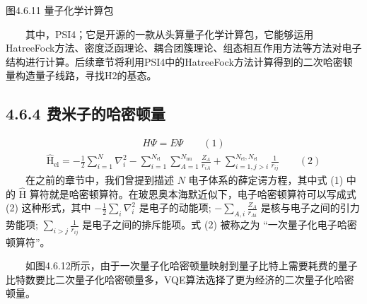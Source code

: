 \documentclass[a4paper,11pt,english]{sphinxmanual}
\begin{document}
\begin{center}图4.6.11 量子化学计算包
\end{center}
\sphinxAtStartPar
  其中，PSI4；它是开源的一款从头算量子化学计算包，它能够运用Hatree\sphinxhyphen{}Fock方法、密度泛函理论、耦合团簇理论、组态相互作用方法等方法对电子结构进行计算。后续章节将利用PSI4中的Hatree\sphinxhyphen{}Fock方法计算得到的二次哈密顿量构造量子线路，寻找H2的基态。


\subsection{4.6.4 费米子的哈密顿量}
\label{\detokenize{rst/4.6VQE_u7b97_u6cd5:id4}}
\sphinxAtStartPar
{}
\begin{equation*}
\begin{split}H \Psi=E \Psi \qquad (1)\end{split}
\end{equation*}\begin{equation*}
\begin{split}\hat{\mathrm{H}}_{\mathrm{el}}=-\frac{1}{2} \sum_{i=1}^{N} \nabla_{i}^{2}-\sum_{i=1}^{N_{\mathrm{el}}} \sum_{A=1}^{N_{\mathrm{nu}}} \frac{Z_{A}}{r_{i A}}+\sum_{i=1, j>i}^{N_{\mathrm{el}}, N_{\mathrm{el}}} \frac{1}{r_{i j}} \qquad(2)\end{split}
\end{equation*}
\sphinxAtStartPar
  在之前的章节中，我们曾提到描述  \(N\) 电子体系的薛定谔方程，其中式 (1) 中的  \(\hat{\mathrm{H}}\) 算符就是哈密顿算符。在玻恩\sphinxhyphen{}奥本海默近似下，电子哈密顿算符可以写成式 (2) 这种形式，其中  \(-\frac{1}{2} \sum_{i} \nabla_{i}^{2}\) 是电子的动能项;  \(-\sum_{A,i} \frac{Z_{A}}{r_{A i}}\) 是核与电子之间的引力势能项;  \(\sum_{i>j}\frac{1}{r_{i j}}\) 是电子之间的排斥能项。式 (2) 被称之为 “一次量子化电子哈密顿算符”。

\sphinxAtStartPar
  如图4.6.12所示，由于一次量子化哈密顿量映射到量子比特上需要耗费的量子比特数要比二次量子化哈密顿量多，VQE算法选择了更为经济的二次量子化哈密顿量。

\end{document}
